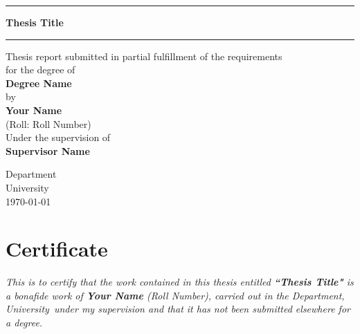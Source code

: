 \documentclass[11pt,a4paper]{report}\usepackage[]{graphicx}\usepackage[]{color}
\newcommand{\Thesis}{Thesis Title}
\newcommand{\Degree}{Degree Name}
\newcommand{\Name}{Your Name}
\newcommand{\Roll}{Roll Number}
\newcommand{\Supervisor}{Supervisor Name} %
\newcommand{\Department}{Department}
\newcommand{\University}{University}
\begin{document}
\begin{titlepage}
\centering

\hrule
\vspace{5pt}
\begin{LARGE}
\textbf{\Thesis}
\end{LARGE}
\vspace{12pt}
\hrule
\vspace*{\fill}

\begin{Large}
Thesis report submitted in partial fulfillment of the requirements\\[6pt]
for the degree of\\[6pt]
\textbf{\Degree}\\[12pt]
by\\[6pt]
\textbf{\Name}\\[6pt]
(Roll: \Roll)\\[12pt]
Under the supervision of\\[6pt]
\textbf{\Supervisor}\\
\end{Large}
\vfill

\begin{figure}[H]
\centering
\end{figure}
\vspace{\fill}

\begin{Large}
\Department\\
\University\\
\today
\end{Large}

\end{titlepage}






\chapter*{\centering Certificate}

\textit{This is to certify that the work contained in this thesis entitled \textbf{``\Thesis"} is a bonafide work of \textbf{\Name} (\Roll), carried out in the \Department, \University\ under my supervision and that it has not been submitted elsewhere for a degree. }
\end{document}
